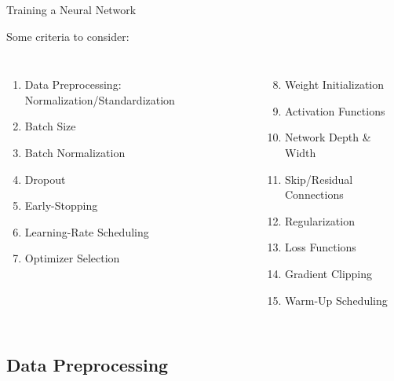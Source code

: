 \documentclass[aspectratio=169,xcolor=dvipsnames,svgnames,x11names,fleqn]{beamer}
\begin{document}
\begin{frame}{Training a Neural Network}

Some criteria to consider:

\footnotesize


\begin{columns}

    \begin{enumerate}
\item Data Preprocessing: Normalization/Standardization
\item Batch Size
\item Batch Normalization
\item Dropout
\item Early-Stopping
\item Learning-Rate Scheduling
\item Optimizer Selection
    \end{enumerate}

\begin{enumerate}
    \setcounter{enumi}{7}
    \item Weight Initialization
\item Activation Functions
\item Network Depth \& Width
\item Skip/Residual Connections
\item Regularization
\item Loss Functions
\item Gradient Clipping
\item Warm-Up Scheduling
\end{enumerate}

\end{columns}



\end{frame}

\subsection{Data Preprocessing}

\begin{frame}
    \subsectionpage
\end{frame}
\end{document}
